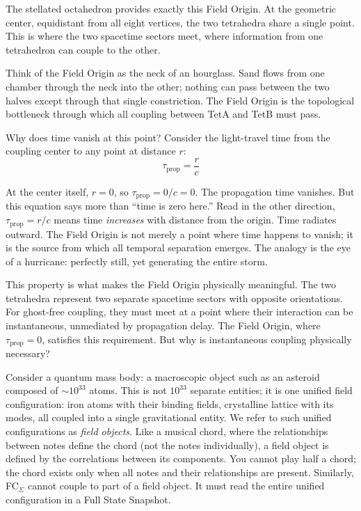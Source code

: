 \documentclass[aps,prd,preprint,superscriptaddress,showpacs,preprintnumbers,amsmath,amssymb,nofootinbib]{revtex4-2}
\begin{document}
The stellated octahedron provides exactly this Field Origin. At the geometric center, equidistant from all eight vertices, the two tetrahedra share a single point. This is where the two spacetime sectors meet, where information from one tetrahedron can couple to the other.

Think of the Field Origin as the neck of an hourglass. Sand flows from one chamber through the neck into the other; nothing can pass between the two halves except through that single constriction. The Field Origin is the topological bottleneck through which all coupling between TetA and TetB must pass.

Why does time vanish at this point? Consider the light-travel time from the coupling center to any point at distance $r$:
\begin{equation}
\tau_{\text{prop}} = \frac{r}{c}
\end{equation}

At the center itself, $r = 0$, so $\tau_{\text{prop}} = 0/c = 0$. The propagation time vanishes. But this equation says more than ``time is zero here.'' Read in the other direction, $\tau_{\text{prop}} = r/c$ means time \emph{increases} with distance from the origin. Time radiates outward. The Field Origin is not merely a point where time happens to vanish; it is the source from which all temporal separation emerges. The analogy is the eye of a hurricane: perfectly still, yet generating the entire storm.

This property is what makes the Field Origin physically meaningful. The two tetrahedra represent two separate spacetime sectors with opposite orientations. For ghost-free coupling, they must meet at a point where their interaction can be instantaneous, unmediated by propagation delay. The Field Origin, where $\tau_{\text{prop}} = 0$, satisfies this requirement. But why is instantaneous coupling physically necessary?

Consider a quantum mass body: a macroscopic object such as an asteroid composed of $\sim 10^{33}$ atoms. This is not $10^{33}$ separate entities; it is one unified field configuration: iron atoms with their binding fields, crystalline lattice with its modes, all coupled into a single gravitational entity. We refer to such unified configurations as \emph{field objects}. Like a musical chord, where the relationships between notes define the chord (not the notes individually), a field object is defined by the correlations between its components. You cannot play half a chord; the chord exists only when all notes and their relationships are present. Similarly, FC$_{\Sigma}$ cannot couple to part of a field object. It must read the entire unified configuration in a Full State Snapshot.
\end{document}
